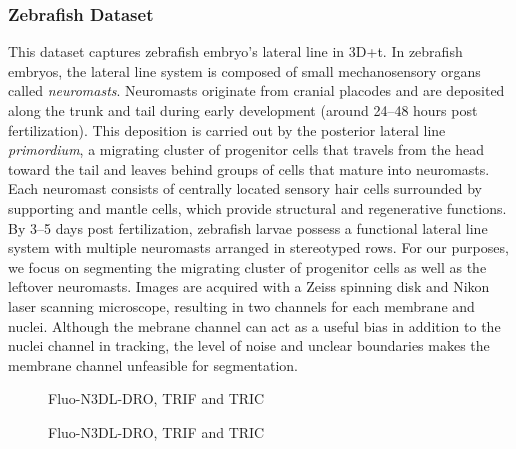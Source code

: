 \subsubsection{Zebrafish Dataset}

This dataset captures zebrafish embryo's lateral line in 3D+t. In zebrafish embryos, the lateral line system is composed of small mechanosensory organs called \textit{neuromasts}. Neuromasts originate from cranial placodes and are deposited along the trunk and tail during early development (around 24--48 hours post fertilization). This deposition is carried out by the posterior lateral line \textit{primordium}, a migrating cluster of progenitor cells that travels from the head toward the tail and leaves behind groups of cells that mature into neuromasts. Each neuromast consists of centrally located sensory hair cells surrounded by supporting and mantle cells, which provide structural and regenerative functions. By 3--5 days post fertilization, zebrafish larvae possess a functional lateral line system with multiple neuromasts arranged in stereotyped rows. For our purposes, we focus on segmenting the migrating cluster of progenitor cells as well as the leftover neuromasts. Images are acquired with a Zeiss spinning disk and Nikon laser scanning microscope, resulting in two channels for each membrane and nuclei. Although the mebrane channel can act as a useful bias in addition to the nuclei channel in tracking, the level of noise and unclear boundaries makes the membrane channel unfeasible for segmentation.

\begin{figure}[!ht]
    \centering
    \caption{Fluo-N3DL-DRO, TRIF and TRIC}
    \label{fig:slicing}
\end{figure}


\begin{figure}[!ht]
    \centering
    \caption{Fluo-N3DL-DRO, TRIF and TRIC}
    \label{fig:slicing}
\end{figure}


